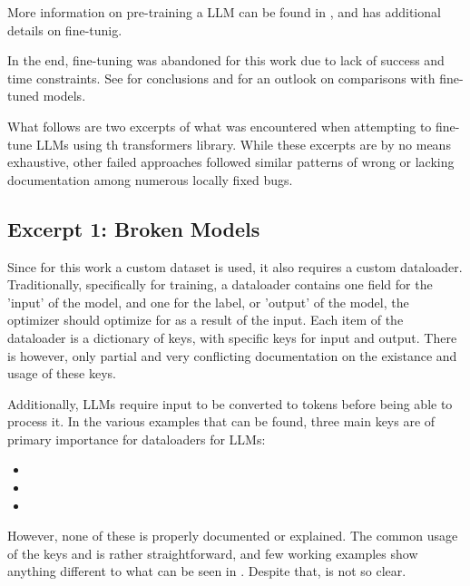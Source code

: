 More information on pre-training a \gls{LLM} can be found in , and  has additional details on fine-tunig.

In the end, fine-tuning was abandoned for this work due to lack of success and time constraints. See  for conclusions and  for an outlook on comparisons with fine-tuned models.

What follows are two excerpts of what was encountered when attempting to fine-tune \glspl{LLM} using th \gls{transformers} library.
While these excerpts are by no means exhaustive, other failed approaches followed similar patterns of wrong or lacking documentation among numerous locally fixed bugs.

\subsection{Excerpt 1: Broken Models}\label{sub:brokenft}
Since for this work a custom dataset is used, it also requires a custom dataloader.
Traditionally, specifically for training, a dataloader contains one field for the 'input' of the model, and one for the label, or 'output' of the model, the optimizer should optimize for as a result of the input.
Each item of the dataloader is a dictionary of keys, with specific keys for input and output.
There is however, only partial and very conflicting documentation on the existance and usage of these keys.

Additionally, \glspl{LLM} require input to be converted to tokens before being able to process it.
In the various examples that can be found, three main keys are of primary importance for dataloaders for \glspl{LLM}:

\begin{itemize}
    \item {}
    \item {}
    \item {}
\end{itemize}


However, none of these is properly documented or explained.
The common usage of the keys  and  is rather straightforward, and few working examples show anything different to what can be seen in .
Despite that,  is not so clear.

